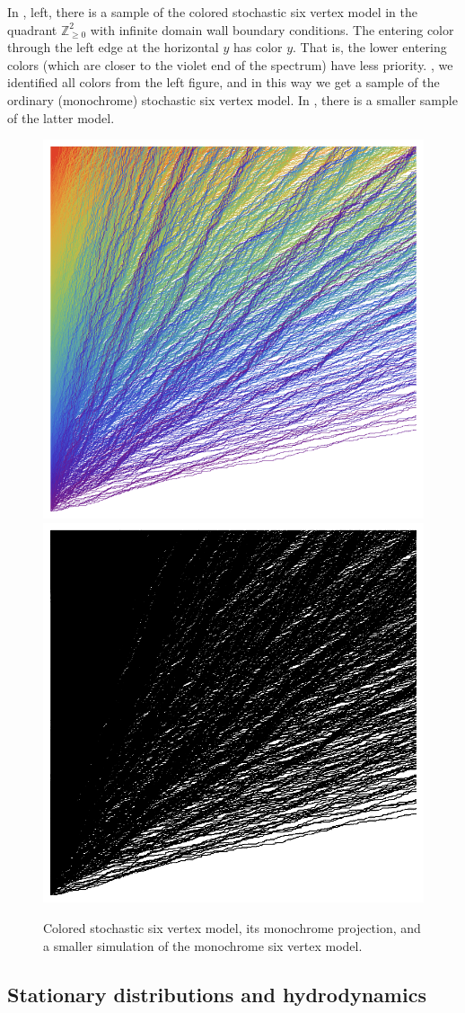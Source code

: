 \documentclass[letterpaper,11pt,oneside,reqno]{article}
\numberwithin{equation}{section}
\theoremstyle{definition}
\theoremstyle{remark}
\begin{document}
In , 
left, there is a sample of the colored stochastic
six vertex model in the quadrant $\mathbb{Z}_{\ge0}^{2}$ with infinite domain
wall boundary conditions.
The entering color through the left edge at the horizontal $y$ has color $y$.
That is, the lower entering colors (which are closer to the violet end of the spectrum)
have less priority.
, 
we identified all colors from the left figure, and in this way we get a sample
of the 
ordinary (monochrome) stochastic six vertex model.
In , there is a smaller sample of the latter model.

\begin{figure}[htpb]
	\centering
	\includegraphics[width=.3\textwidth]{./images/CS6V.png}
	\quad
	\includegraphics[width=.3\textwidth]{./images/S6V.png}
	\quad
	\caption{Colored stochastic six vertex model, its monochrome projection,
	and a smaller simulation of the monochrome six vertex model.}
	\label{fig:CS6V}
\end{figure}

\subsection{Stationary distributions and hydrodynamics}
\label{sub:hydrodynamic_analysis}
\end{document}
